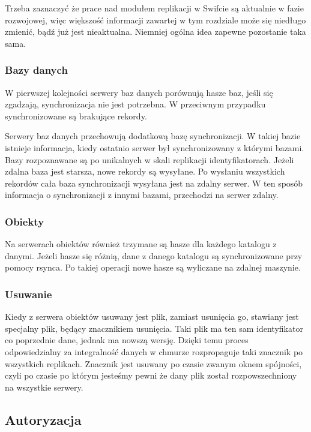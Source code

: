 Trzeba zaznaczyć że prace nad modułem replikacji w Swifcie są aktualnie w fazie rozwojowej, więc większość informacji zawartej w tym rozdziale może się niedługo zmienić, bądź już jest nieaktualna. Niemniej ogólna idea zapewne pozostanie taka sama.

\subsubsection{Bazy danych}\label{sub:bazy danych}

W pierwszej kolejności serwery baz danych porównują hasze baz, jeśli się zgadzają, synchronizacja nie jest potrzebna. W przeciwnym przypadku synchronizowane są brakujące rekordy.

Serwery baz danych przechowują dodatkową bazę synchronizacji. W takiej bazie istnieje informacja, kiedy ostatnio serwer był synchronizowany z którymi bazami. Bazy rozpoznawane są po unikalnych w skali replikacji identyfikatorach. Jeżeli zdalna baza jest starsza, nowe rekordy są wysyłane. Po wysłaniu wszystkich rekordów cała baza synchronizacji wysyłana jest na zdalny serwer. W ten sposób informacja o synchronizacji z innymi bazami, przechodzi na serwer zdalny.

\subsubsection{Obiekty}\label{sub:obiekty}

Na serwerach obiektów również trzymane są hasze dla każdego katalogu z danymi. Jeżeli hasze się różnią, dane z danego katalogu są synchronizowane przy pomocy rsynca. Po takiej operacji nowe hasze są wyliczane na zdalnej maszynie.

\subsubsection{Usuwanie}\label{sub:usuwanie}

Kiedy z serwera obiektów usuwany jest plik, zamiast usunięcia go, stawiany jest specjalny plik, będący znacznikiem usunięcia. Taki plik ma ten sam identyfikator co poprzednie dane, jednak ma nowszą wersję. Dzięki temu proces odpowiedzialny za integralność danych w chmurze rozpropaguje taki znacznik po wszystkich replikach. Znacznik jest usuwany po czasie zwanym oknem spójności, czyli po czasie po którym jesteśmy pewni że dany plik został rozpowszechniony na wszystkie serwery.

\subsection{Autoryzacja}\label{sec:autoryzacja}


